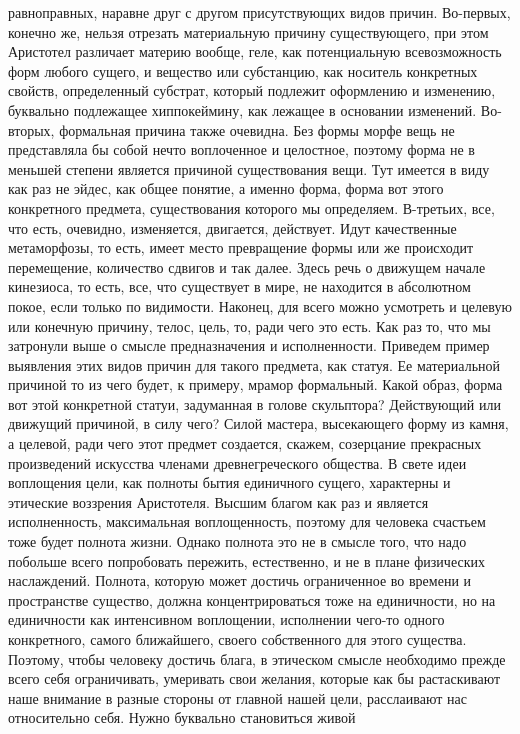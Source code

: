 равноправных, наравне друг с другом присутствующих видов причин. Во-первых,
конечно же, нельзя отрезать материальную причину существующего, при этом
Аристотел различает материю вообще, геле, как потенциальную всевозможность форм
любого сущего, и вещество или субстанцию, как носитель конкретных свойств,
определенный субстрат, который подлежит оформлению и изменению, буквально
подлежащее хиппокеймину, как лежащее в основании изменений. Во-вторых,
формальная причина также очевидна. Без формы морфе вещь не представляла бы собой
нечто воплоченное и целостное, поэтому форма не в меньшей степени является
причиной существования вещи. Тут имеется в виду как раз не эйдес, как общее
понятие, а именно форма, форма вот этого конкретного предмета, существования
которого мы определяем. В-третьих, все, что есть, очевидно, изменяется,
двигается, действует. Идут качественные метаморфозы, то есть, имеет место
превращение формы или же происходит перемещение, количество сдвигов и так далее.
Здесь речь о движущем начале кинезиоса, то есть, все, что существует в мире, не
находится в абсолютном покое, если только по видимости. Наконец, для всего можно
усмотреть и целевую или конечную причину, телос, цель, то, ради чего это есть.
Как раз то, что мы затронули выше о смысле предназначения и исполненности.
Приведем пример выявления этих видов причин для такого предмета, как статуя. Ее
материальной причиной то из чего будет, к примеру, мрамор формальный. Какой
образ, форма вот этой конкретной статуи, задуманная в голове скульптора?
Действующий или движущий причиной, в силу чего? Силой мастера, высекающего форму
из камня, а целевой, ради чего этот предмет создается, скажем, созерцание
прекрасных произведений искусства членами древнегреческого общества. В свете
идеи воплощения цели, как полноты бытия единичного сущего, характерны и
этические воззрения Аристотеля. Высшим благом как раз и является исполненность,
максимальная воплощенность, поэтому для человека счастьем тоже будет полнота
жизни. Однако полнота это не в смысле того, что надо побольше всего попробовать
пережить, естественно, и не в плане физических наслаждений. Полнота, которую
может достичь ограниченное во времени и пространстве существо, должна
концентрироваться тоже на единичности, но на единичности как интенсивном
воплощении, исполнении чего-то одного конкретного, самого ближайшего, своего
собственного для этого существа. Поэтому, чтобы человеку достичь блага, в
этическом смысле необходимо прежде всего себя ограничивать, умеривать свои
желания, которые как бы растаскивают наше внимание в разные стороны от главной
нашей цели, расслаивают нас относительно себя. Нужно буквально становиться живой
